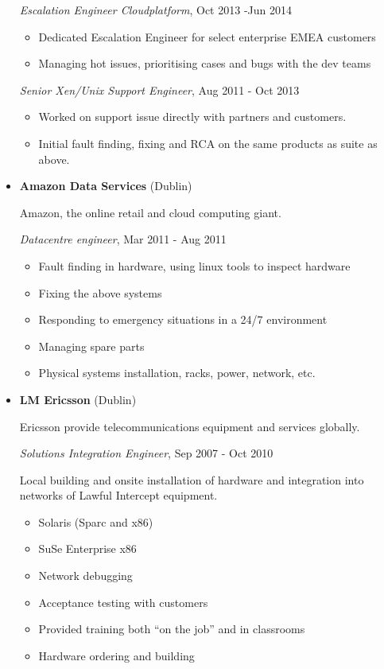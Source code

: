 \documentclass[]{article}
\providecommand{\tightlist}{%
  \setlength{\itemsep}{0pt}\setlength{\parskip}{0pt}}
\begin{document}
\begin{itemize}
  \emph{Escalation Engineer Cloudplatform}, Oct 2013 -Jun 2014

  \begin{itemize}
  \tightlist
  \item
    Dedicated Escalation Engineer for select enterprise EMEA customers
  \item
    Managing hot issues, prioritising cases and bugs with the dev teams
  \end{itemize}

  \emph{Senior Xen/Unix Support Engineer}, Aug 2011 - Oct 2013

  \begin{itemize}
  \tightlist
  \item
    Worked on support issue directly with partners and customers.
  \item
    Initial fault finding, fixing and RCA on the same products as suite
    as above.
  \end{itemize}
\item
  \textbf{Amazon Data Services} (Dublin)

  Amazon, the online retail and cloud computing giant.

  \emph{Datacentre engineer}, Mar 2011 - Aug 2011

  \begin{itemize}
  \tightlist
  \item
    Fault finding in hardware, using linux tools to inspect hardware
  \item
    Fixing the above systems
  \item
    Responding to emergency situations in a 24/7 environment
  \item
    Managing spare parts
  \item
    Physical systems installation, racks, power, network, etc.
  \end{itemize}
\item
  \textbf{LM Ericsson} (Dublin)

  Ericsson provide telecommunications equipment and services globally.

  \emph{Solutions Integration Engineer}, Sep 2007 - Oct 2010

  Local building and onsite installation of hardware and integration
  into networks of Lawful Intercept equipment.

  \begin{itemize}
  \tightlist
  \item
    Solaris (Sparc and x86)
  \item
    SuSe Enterprise x86
  \item
    Network debugging
  \item
    Acceptance testing with customers
  \item
    Provided training both ``on the job'' and in classrooms
  \item
    Hardware ordering and building
  \end{itemize}
\end{itemize}
\end{document}
